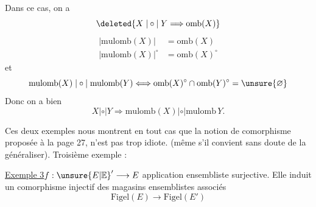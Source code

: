 Dans ce cas, on a 
\[
\deleted{X\mathrel{|\circ|}Y\Longrightarrow\mathrm{omb}(X)}
\]
\[
\begin{aligned}
|\mathrm{mulomb}(X)|&=\mathrm{omb}(X)\\
|\mathrm{mulomb}(X)|^\circ&=\mathrm{omb}(X)^\circ
\end{aligned}
\]
et
\[
\mathrm{mulomb}(X)\mathrel{|\circ|}\mathrm{mulomb}(Y)\Longleftrightarrow\mathrm{omb}(X)^\circ\cap\mathrm{omb}(Y)^\circ=\unsure{\varnothing}
\]
Donc on a bien
\[
X\mathrel{|\circ|}Y\Longrightarrow\mathrm{mulomb}(X)\mathrel{|\circ|}\mathrm{mulomb}\,Y.
\]

Ces deux exemples nous montrent en tout cas que la notion de comorphisme proposée à la page 27, n'est pas trop idiote. (même s'il convient sans doute de la généraliser). Troisième exemple :

\uline{Exemple 3}\quad $f:\unsure{E|\mathbb{E}}'\longrightarrow E$ application ensembliste surjective. Elle induit un comorphisme injectif des magasins ensemblistes associés
\[
\mathrm{Figel}(E)\longrightarrow\mathrm{Figel}(E')
\]
